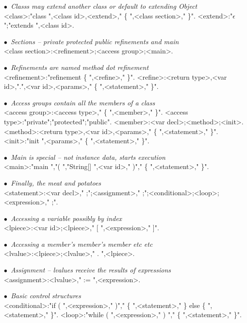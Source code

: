 \newcommand{\comment}[1]{{\escapegrammar$\bullet$\it\ #1}\\}

\begin{grammar}

\comment{Classs may extend another class or default to extending Object}
<class>:"class ",<class id>,<extend>," \{ ",<class section>,"{\small *} \}".
<extend>:"$\epsilon$";"extends ",<class id>.

\comment{Sections -- private protected public refinements and main}
<class section>:<refinement>;<access group>;<main>.

\comment{Refinements are named method dot refinement}
<refinement>:"refinement \{ ",<refine>,"{\small *} \}".
<refine>:<return type>,<var id>,".",<var id>,<params>," \{ ",<statement>,"{\small *} \}".

\comment{Access groups contain all the members of a class}
<access group>:<access type>," \{ ",<member>,"{\small *} \}".
<access type>:"private";"protected";"public".
<member>:<var decl>;<method>;<init>.
<method>:<return type>,<var id>,<params>," \{ ",<statement>,"{\small *} \}".
<init>:"init ",<params>," \{ ",<statement>,"{\small *} \}".

\comment{Main is special -- not instance data, starts execution}
<main>:"main ","( ","String[] ",<var id>," )"," \{ ",<statement>,"{\small *} \}".

\comment{Finally, the meat and potatoes}
<statement>:<var decl>," ;";<assignment>," ;";<conditional>;<loop>;<expression>," ;".

\comment{Accessing a variable possibly by index}
<lpiece>:<var id>;<lpiece>," [ ",<expression>," ]".

\comment{Accessing a member's member's member etc etc}
<lvalue>:<lpiece>;<lvalue>," . ",<lpiece>.

\comment{Assignment -- lvalues receive the results of expressions}
<assignment>:<lvalue>," := ",<expression>.

\comment{Basic control structures}
<conditional>:"if ( ",<expression>," )"," \{ ",<statement>,"{\small *} \} else \{ ",<statement>,"{\small *} \}".
<loop>:"while ( ",<expression>," ) "," \{ ",<statement>,"{\small *} \}".


\end{grammar}
